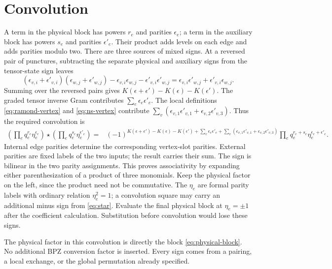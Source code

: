\documentclass[11pt]{article}
\numberwithin{equation}{section}
\begin{document}
\section{Convolution}

A term in the physical block has powers $r_e$ and parities $\epsilon_e$;
a term in the auxiliary block has powers $s_e$ and parities $\epsilon'_e$.
Their product adds levels on each edge and adds parities modulo two.
There are three sources of mixed signs. At a reversed pair of
punctures, subtracting the separate physical and auxiliary signs from the
tensor-state sign leaves
\begin{equation}
 (\epsilon_{v,i}+\epsilon'_{v,i})(\epsilon_{w,j}+\epsilon'_{w,j})
 -\epsilon_{v,i}\epsilon_{w,j}-\epsilon'_{v,i}\epsilon'_{w,j}
 =\epsilon_{v,i}\epsilon'_{w,j}+\epsilon'_{v,i}\epsilon_{w,j}.
 \label{eq:mixed-crossing}
\end{equation}
Summing over the reversed pairs gives
$K(\epsilon+\epsilon')-K(\epsilon)-K(\epsilon')$.
The graded tensor inverse Gram contributes
$\sum_e\epsilon_e\epsilon'_e$. The local definitions
\eqref{eq:ramond-vertex} and \eqref{eq:ns-vertex} contribute
$\sum_v(\epsilon_{v,1}\epsilon'_{v,1}
       +\epsilon_{v,2}\epsilon'_{v,3})$.
Thus the required convolution is
\begin{align}
 \left(\prod_e q_e^{r_e}\eta_e^{\epsilon_e}\right)\star
 \left(\prod_e q_e^{s_e}\eta_e^{\epsilon'_e}\right)
 ={}&(-1)^{K(\epsilon+\epsilon')-K(\epsilon)-K(\epsilon')
             +\sum_e\epsilon_e\epsilon'_e
             +\sum_v(\epsilon_{v,1}\epsilon'_{v,1}
                        +\epsilon_{v,2}\epsilon'_{v,3})}
 \prod_e q_e^{r_e+s_e}\eta_e^{\epsilon_e+\epsilon'_e}.
 \label{eq:star}
\end{align}
Internal edge parities determine the corresponding vertex-slot
parities. External parities are fixed labels of the two inputs; the
result carries their sum. The sign is
bilinear in the two parity assignments. This proves associativity by
expanding either parenthesization of a product of three monomials.
Keep the physical factor on the left, since the product need not be
commutative. The $\eta_e$ are formal parity labels with ordinary
relation $\eta_e^2=1$; a convolution square may carry an additional
minus sign from \eqref{eq:star}. Evaluate the final physical block at
$\eta_e=\pm1$ after the coefficient calculation. Substitution before
convolution would lose these signs.

The physical factor in this convolution is directly the block
\eqref{eq:physical-block}. No additional BPZ conversion factor is
inserted. Every sign comes from a pairing, a local exchange, or the
global permutation already specified.
\end{document}
